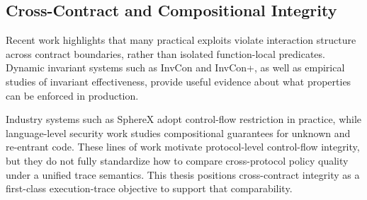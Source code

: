 \subsection{Cross-Contract and Compositional Integrity}

Recent work highlights that many practical exploits violate interaction structure across contract boundaries,
rather than isolated function-local predicates.
Dynamic invariant systems such as InvCon and InvCon+\cite{liu2022invcon,liu2024automated},
as well as empirical studies of invariant effectiveness\cite{chen2024demystifying},
provide useful evidence about what properties can be enforced in production.

Industry systems such as SphereX adopt control-flow restriction in practice\cite{spherex},
while language-level security work studies compositional guarantees for unknown and re-entrant code\cite{cecchetti2020securing,cecchetti2021compositional}.
These lines of work motivate protocol-level control-flow integrity, but they do not fully standardize how to compare cross-protocol policy quality under a unified trace semantics.
This thesis positions cross-contract integrity as a first-class execution-trace objective to support that comparability.
